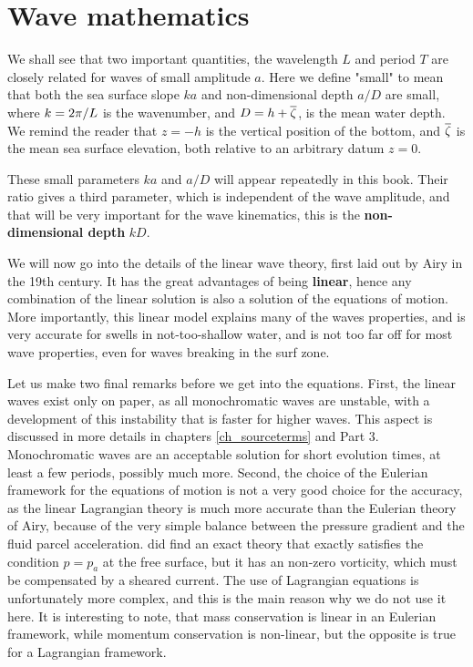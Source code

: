 \section{Wave mathematics}
We shall see that two important quantities, the wavelength $L$ and period $T$ are closely related 
for waves of small amplitude $a$. Here we define "small" to  mean that both the sea surface slope $ka$ and non-dimensional depth $a/D$ are small, 
where $k=2\pi/L$ is the wavenumber, and $D=h+\overline{\zeta}$, is the mean water depth. We remind the reader that $z=-h$
is the vertical position of the bottom, and $\overline{\zeta}$ is the mean sea surface elevation, both relative to an arbitrary datum 
$z=0$.

These small parameters $ka$ and $a/D$ will appear repeatedly in this book. Their ratio gives a third parameter, which is independent 
of the wave amplitude, and that will be very important for the wave kinematics, this is the 
\textbf{non-dimensional depth} $kD$.

We will now go into the details of the linear wave theory, first 
laid out by Airy in the 19th century. It has the great advantages of being  \textbf{linear}, hence any combination of the 
linear solution is also a solution of the equations of motion. More importantly, this linear model explains many of the waves properties, 
and is very accurate for swells in not-too-shallow water, and is not too far off for most wave properties, even for waves 
breaking in the surf zone.  

Let us make two final remarks before we get into the equations. 
First, the linear waves exist only on paper, as all monochromatic waves are unstable, with a development of this instability 
that is faster for higher waves. This aspect is discussed in more details in chapters \ref{ch_sourceterms} and Part 3. 
Monochromatic waves are an acceptable solution for short evolution times, at least a few periods, possibly much more. Second, 
the choice of the Eulerian framework for the equations of motion
is not a very good choice for the accuracy, as the linear Lagrangian theory 
is much more accurate than the Eulerian theory of Airy, because of the very simple balance between the pressure gradient and the 
fluid parcel acceleration.  
\cite{vonGerstner1809} did find an exact theory that exactly satisfies the condition $p=p_a$ at the free surface, 
but it has an non-zero vorticity, which must be compensated by a sheared current. 
The use of Lagrangian equations is unfortunately 
more complex, and this is the main reason why we do not use it here. It is interesting to note, that 
mass conservation is linear in an Eulerian framework, 
while momentum conservation is non-linear, but the opposite is true for a Lagrangian framework. 

